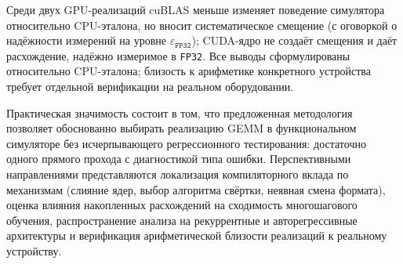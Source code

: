 Среди двух GPU-реализаций cuBLAS меньше изменяет поведение симулятора
относительно CPU-эталона, но вносит систематическое смещение (с оговоркой о
надёжности измерений на уровне $\varepsilon_{\texttt{FP32}}$); CUDA-ядро не
создаёт смещения и даёт расхождение, надёжно измеримое в \texttt{FP32}. Все
выводы сформулированы относительно CPU-эталона; близость к арифметике конкретного
устройства требует отдельной верификации на реальном оборудовании.

Практическая значимость состоит в том, что предложенная методология позволяет
обоснованно выбирать реализацию GEMM в функциональном симуляторе без
исчерпывающего регрессионного тестирования: достаточно одного прямого прохода с
диагностикой типа ошибки. Перспективными направлениями представляются локализация
компиляторного вклада по механизмам (слияние ядер, выбор алгоритма свёртки,
неявная смена формата), оценка влияния накопленных расхождений на сходимость
многошагового обучения, распространение анализа на рекуррентные и
авторегрессивные архитектуры и верификация арифметической близости реализаций к
реальному устройству.
